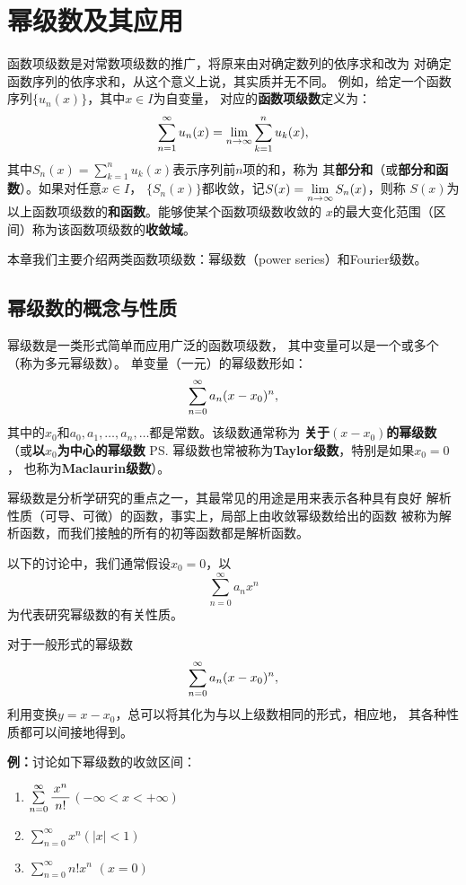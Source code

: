 \section{幂级数及其应用}

函数项级数是对常数项级数的推广，将原来由对确定数列的依序求和改为
对确定函数序列的依序求和，从这个意义上说，其实质并无不同。
例如，给定一个函数序列$\{u_n(x)\}$，其中$x\in I$为自变量，
对应的{\bf 函数项级数}定义为：
$$\sumn u_n(x)=\limn\sum\limits_{k=1}^nu_k(x),$$
其中$S_n(x)=\sum\limits_{k=1}^nu_k(x)$表示序列前$n$项的和，称为
其{\bf 部分和}（或{\bf 部分和函数}）。如果对任意$x\in I$，
$\{S_n(x)\}$都收敛，记$S(x)=\limn S_n(x)$，则称
$S(x)$为以上函数项级数的{\bf 和函数}。能够使某个函数项级数收敛的
$x$的最大变化范围（区间）称为该函数项级数的{\bf 收敛域}。

本章我们主要介绍两类函数项级数：幂级数（power series）和Fourier级数。

\subsection{幂级数的概念与性质}

幂级数是一类形式简单而应用广泛的函数项级数，
其中变量可以是一个或多个（称为{\kaishu 多元幂级数}）。
单变量（一元）的幂级数形如：
$$\sumn[0]a_n(x-x_0)^n,$$
其中的$x_0$和$a_0,a_1,\ldots,a_n,\ldots$都是常数。该级数通常称为
{\bf 关于$(x-x_0)$的幂级数}（或{\bf 以$x_0$为中心的幂级数}
\ps{幂级数也常被称为{\bf Taylor级数}，特别是如果$x_0=0$，
也称为{\bf Maclaurin级数}}）。

幂级数是分析学研究的重点之一，其最常见的用途是用来表示各种具有良好
解析性质（可导、可微）的函数，事实上，局部上由收敛幂级数给出的函数
被称为{\kaishu 解析函数}，而我们接触的所有的初等函数都是解析函数。

以下的讨论中，我们通常假设$x_0=0$，以
$${\sum\limits_{n=0}^{\infty}a_nx^n}$$
为代表研究幂级数的有关性质。

对于一般形式的幂级数
$$\sumn[0]a_n(x-x_0)^n,$$
利用变换$y=x-x_0$，总可以将其化为与以上级数相同的形式，相应地，
其各种性质都可以间接地得到。

{\bf 例：}讨论如下幂级数的{\kaishu 收敛区间}：
\begin{enumerate}[(1)]
  \setlength{\itemindent}{1cm}
  \item $\sum\limits_{n=0}^{\infty}\df{x^n}{n!}$\hfill $(-\infty<x<+\infty)$
  \item $\sum\limits_{n=0}^{\infty}x^n$\hfill $(|x|<1)$
  \item $\sum\limits_{n=0}^{\infty}n!x^n$ \hfill $(x=0)$
\end{enumerate}

